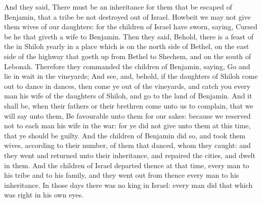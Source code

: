 \begin{biblechapter}
\verse And they said, There must be an inheritance for them that be escaped of Benjamin, that a tribe be not destroyed out of Israel.
\verse Howbeit we may not give them wives of our daughters: for the children of Israel have sworn, saying, Cursed be he that giveth a wife to Benjamin.
\verse Then they said, Behold, there is a feast of the \LORD in Shiloh yearly in a place which is on the north side of Bethel, on the east side of the highway that goeth up from Bethel to Shechem, and on the south of Lebonah.
\verse Therefore they commanded the children of Benjamin, saying, Go and lie in wait in the vineyards;
\verse And see, and, behold, if the daughters of Shiloh come out to dance in dances, then come ye out of the vineyards, and catch you every man his wife of the daughters of Shiloh, and go to the land of Benjamin.
\verse And it shall be, when their fathers or their brethren come unto us to complain, that we will say unto them, Be favourable unto them for our sakes: because we reserved not to each man his wife in the war: for ye did not give unto them at this time, that ye should be guilty.
\verse And the children of Benjamin did so, and took them wives, according to their number, of them that danced, whom they caught: and they went and returned unto their inheritance, and repaired the cities, and dwelt in them.
\verse And the children of Israel departed thence at that time, every man to his tribe and to his family, and they went out from thence every man to his inheritance.
\verse In those days there was no king in Israel: every man did that which was right in his own eyes.
\end{biblechapter}
